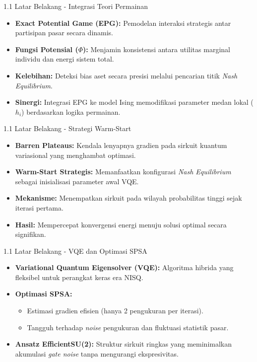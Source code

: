 \begin{frame}{1.1 Latar Belakang - Integrasi Teori Permainan}
    \begin{itemize}
        \item \textbf{Exact Potential Game (EPG):} Pemodelan interaksi strategis antar partisipan pasar secara dinamis.
        \item \textbf{Fungsi Potensial ($\Phi$):} Menjamin konsistensi antara utilitas marginal individu dan energi sistem total.
        \item \textbf{Kelebihan:} Deteksi bias aset secara presisi melalui pencarian titik \textit{Nash Equilibrium}.
        \item \textbf{Sinergi:} Integrasi EPG ke model Ising memodifikasi parameter medan lokal ($h_i$) berdasarkan logika permainan.
    \end{itemize}
\end{frame}

\begin{frame}{1.1 Latar Belakang - Strategi Warm-Start}
    \begin{itemize}
        \item \textbf{Barren Plateaus:} Kendala lenyapnya gradien pada sirkuit kuantum variasional yang menghambat optimasi.
        \item \textbf{Warm-Start Strategis:} Memanfaatkan konfigurasi \textit{Nash Equilibrium} sebagai inisialisasi parameter awal VQE.
        \item \textbf{Mekanisme:} Menempatkan sirkuit pada wilayah probabilitas tinggi sejak iterasi pertama.
        \item \textbf{Hasil:} Mempercepat konvergensi energi menuju solusi optimal secara signifikan.
    \end{itemize}
\end{frame}

\begin{frame}{1.1 Latar Belakang - VQE dan Optimasi SPSA}
    \begin{itemize}
        \item \textbf{Variational Quantum Eigensolver (VQE):} Algoritma hibrida yang fleksibel untuk perangkat keras era NISQ.
        \item \textbf{Optimasi SPSA:}
        \begin{itemize}
            \item Estimasi gradien efisien (hanya 2 pengukuran per iterasi).
            \item Tangguh terhadap \textit{noise} pengukuran dan fluktuasi statistik pasar.
        \end{itemize}
        \item \textbf{Ansatz EfficientSU(2):} Struktur sirkuit ringkas yang meminimalkan akumulasi \textit{gate noise} tanpa mengurangi ekspresivitas.
    \end{itemize}
\end{frame}

